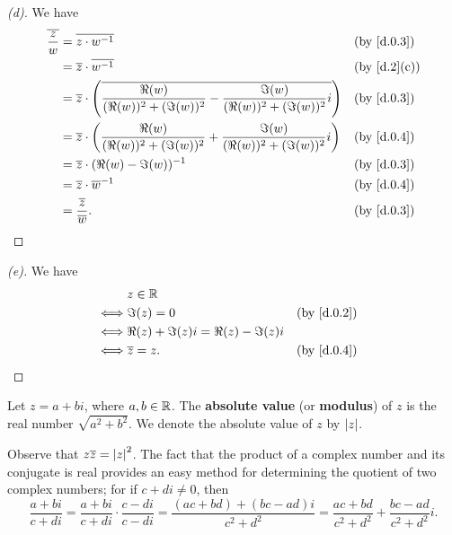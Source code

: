 \begin{proof}[(d)]
  We have
  \begin{align*}
    \conj{\frac{z}{w}} & = \conj{z \cdot w^{-1}}                                                                                        &  & \text{(by \cref{d.0.3})}  \\
                       & = \conj{z} \cdot \conj{w^{-1}}                                                                                 &  & \text{(by \cref{d.2}(c))} \\
                       & = \conj{z} \cdot \pa{\conj{\frac{\Re(w)}{(\Re(w))^2 + (\Im(w))^2} - \frac{\Im(w)}{(\Re(w))^2 + (\Im(w))^2} i}} &  & \text{(by \cref{d.0.3})}  \\
                       & = \conj{z} \cdot \pa{\frac{\Re(w)}{(\Re(w))^2 + (\Im(w))^2} + \frac{\Im(w)}{(\Re(w))^2 + (\Im(w))^2} i}        &  & \text{(by \cref{d.0.4})}  \\
                       & = \conj{z} \cdot (\Re(w) - \Im(w))^{-1}                                                                        &  & \text{(by \cref{d.0.3})}  \\
                       & = \conj{z} \cdot \conj{w}^{-1}                                                                                 &  & \text{(by \cref{d.0.4})}  \\
                       & = \frac{\conj{z}}{\conj{w}}.                                                                                   &  & \text{(by \cref{d.0.3})}
  \end{align*}
\end{proof}

\begin{proof}[(e)]
  We have
  \begin{align*}
         & z \in \R                                                            \\
    \iff & \Im(z) = 0                            &  & \text{(by \cref{d.0.2})} \\
    \iff & \Re(z) + \Im(z) i = \Re(z) - \Im(z) i                               \\
    \iff & \conj{z} = z.                         &  & \text{(by \cref{d.0.4})}
  \end{align*}
\end{proof}

\begin{defn}\label{d.0.5}
  Let \(z = a + bi\), where \(a, b \in \mathbb{R}\).
  The \textbf{absolute value} (or \textbf{modulus}) of \(z\) is the real number \(\sqrt{a^2 + b^2}\).
  We denote the absolute value of \(z\) by \(\left\lvert z\right\rvert\).

  Observe that \(z \overline{z} = \left\lvert z\right\rvert^2\).
  The fact that the product of a complex number and its conjugate is real provides an easy method for determining the quotient of two complex numbers;
  for if \(c + di \neq 0\), then
  \[
    \frac{a + bi}{c + di} = \frac{a + bi}{c + di} \cdot \frac{c - di}{c - di} = \frac{(ac + bd) + (bc - ad) i}{c^2 + d^2} = \frac{ac + bd}{c^2 + d^2} + \frac{bc - ad}{c^2 + d^2} i.
  \]
\end{defn}

